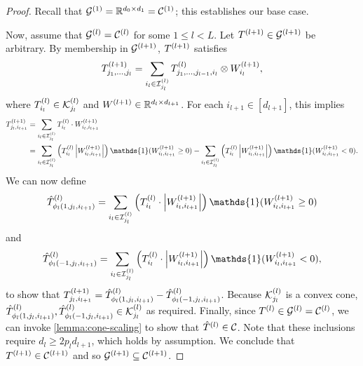 \constraintConvexification*
\begin{proof}
    Recall that
    \( \mathcal{G}^{(1)} = \mathbb{R}^{d_0 \times d_1} = \mathcal{C}^{(1)} \);
    this establishes our base case.

    Now, assume that
    \( \mathcal{G}^{(l)} = \mathcal{C}^{(l)} \) for some \( 1 \leq l < L  \).
    Let \( T^{(l+1)} \in \mathcal{G}^{(l+1)} \) be arbitrary.
    By membership in \( \mathcal{G}^{(l+1)} \), \( T^{(l+1)} \) satisfies
    \[
        T^{(l+1)}_{j_1, \ldots, j_l}
        = \sum_{i_l \in \mathcal{I}_{j_l}^{(l)}} T^{(l)}_{j_1, \ldots, j_{l-1}, i_l}
        \otimes W_{i_l}^{(l+1)},
    \]
    where \( T^{(l)}_{i_l} \in \mathcal{K}^{(l)}_{j_l} \)
    and \( W^{(l+1)} \in \mathbb{R}^{d_l \times d_{l+1}} \).
    For each \( i_{l+1} \in [d_{l+1}] \), this implies
    \begin{align*}
        \Tll_{j_l, i_{l+1}}
         & = \sum_{i_l \in \calI_{j_l}^{(l)}} \Tl_{i_l}
        \cdot W_{i_l, i_{l+1}}^{(l+1)}                       \\
         & = \sum_{i_l \in \calI_{j_l}^{(l)}} \rbr{\Tl_{i_l}
            \abs{W_{i_l, i_{l+1}}^{(l+1)}}} \mathds{1}(W_{i_l, i_{l+1}}^{(l+1)} \geq 0)
        - \sum_{i_l \in \calI_{j_l}^{(l)}} \rbr{\Tl_{i_l}
            \abs{W_{i_l, i_{l+1}}^{(l+1)}}} \mathds{1}(W_{i_l, i_{l+1}}^{(l+1)} < 0).
    \end{align*}
    We can now define
    \[
        \hat{T}^{(l)}_{ \phi_l(1, j_l, i_{l+1})}
        = \sum_{i_l \in \calI_{j_l}^{(l)}} \rbr{\Tl_{i_l}
            \cdot \abs{W_{i_l, i_{l+1}}^{(l+1)}}} \mathds{1}(W_{i_l, i_{l+1}}^{(l+1)} \geq 0)
    \]
    and
    \[
        \hat{T}^{(l)}_{ \phi_l(-1, j_l, i_{l+1})}
        = \sum_{i_l \in \calI_{j_l}^{(l)}} \rbr{\Tl_{i_l}
            \cdot \abs{W_{i_l, i_{l+1}}^{(l+1)}}} \mathds{1}(W_{i_l, i_{l+1}}^{(l+1)} < 0),
    \]
    to show that
    \( T^{(l+1)}_{j_l, i_{l+1}}
    = \hat{T}^{(l)}_{ \phi_l(1, j_l, i_{l+1})} - \hat{T}^{(l)}_{ \phi_l(-1, j_l, i_{l+1})}\).
    Because
    \( \mathcal{K}^{(l)}_{j_l} \) is a convex cone,
    \( \hat{T}^{(l)}_{ \phi_l(1, j_l, i_{l+1})}, \hat{T}^{(l)}_{ \phi_l(-1, j_l, i_{l+1})}
    \in \mathcal{K}^{(l)}_{j_l} \) as required.
    Finally, since \( T^{(l)} \in \mathcal{G}^{(l)} = \mathcal{C}^{(l)} \), we can invoke
    \cref{lemma:cone-scaling} to show that \( \hat{T}^{(l)} \in \mathcal{C} \).
    Note that these inclusions require \( d_{l} \geq 2 p_l d_{l+1} \),
    which holds by assumption.
    We conclude that \( T^{(l+1)} \in \mathcal{C}^{(l+1)} \) and so
    \( \mathcal{G}^{(l+1)} \subseteq \mathcal{C}^{(l+1)} \).


\end{proof}
